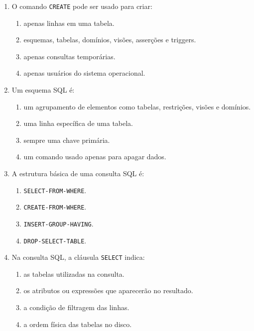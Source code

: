\documentclass[12pt,a4paper]{article}
\begin{document}
\begin{enumerate}[label=\textbf{Q\arabic*.}]
\item O comando \texttt{CREATE} pode ser usado para criar:

\begin{enumerate}[label=\alph*)]
    \item apenas linhas em uma tabela.
    \item esquemas, tabelas, domínios, visões, asserções e triggers.
    \item apenas consultas temporárias.
    \item apenas usuários do sistema operacional.
\end{enumerate}

\item Um esquema SQL é:

\begin{enumerate}[label=\alph*)]
    \item um agrupamento de elementos como tabelas, restrições, visões e domínios.
    \item uma linha específica de uma tabela.
    \item sempre uma chave primária.
    \item um comando usado apenas para apagar dados.
\end{enumerate}

\item A estrutura básica de uma consulta SQL é:

\begin{enumerate}[label=\alph*)]
    \item \texttt{SELECT-FROM-WHERE}.
    \item \texttt{CREATE-FROM-WHERE}.
    \item \texttt{INSERT-GROUP-HAVING}.
    \item \texttt{DROP-SELECT-TABLE}.
\end{enumerate}

\item Na consulta SQL, a cláusula \texttt{SELECT} indica:

\begin{enumerate}[label=\alph*)]
    \item as tabelas utilizadas na consulta.
    \item os atributos ou expressões que aparecerão no resultado.
    \item a condição de filtragem das linhas.
    \item a ordem física das tabelas no disco.
\end{enumerate}


\end{enumerate}
\end{document}
